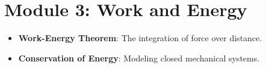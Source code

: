 \documentclass{article}
\begin{document}
\section{Module 3: Work and Energy}
\begin{itemize}
    \item \textbf{Work-Energy Theorem}: The integration of force over distance.
    \item \textbf{Conservation of Energy}: Modeling closed mechanical systems.
\end{itemize}
\end{document}
